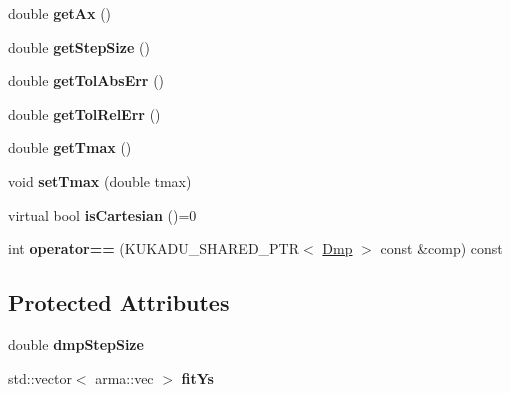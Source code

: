 \begin{DoxyCompactItemize}
\item 
\hypertarget{classkukadu_1_1Dmp_afecc2e30b16281ae8e46fbd0797ba9da}{double {\bfseries get\-Ax} ()}\label{classkukadu_1_1Dmp_afecc2e30b16281ae8e46fbd0797ba9da}

\item 
\hypertarget{classkukadu_1_1Dmp_aa88cf46b01a29848c307ab8c66cd3c1e}{double {\bfseries get\-Step\-Size} ()}\label{classkukadu_1_1Dmp_aa88cf46b01a29848c307ab8c66cd3c1e}

\item 
\hypertarget{classkukadu_1_1Dmp_ae72973627e7443f6b98b07891fba2705}{double {\bfseries get\-Tol\-Abs\-Err} ()}\label{classkukadu_1_1Dmp_ae72973627e7443f6b98b07891fba2705}

\item 
\hypertarget{classkukadu_1_1Dmp_a8a90b4bf9c8acf5a3aeaeb2c82671929}{double {\bfseries get\-Tol\-Rel\-Err} ()}\label{classkukadu_1_1Dmp_a8a90b4bf9c8acf5a3aeaeb2c82671929}

\item 
\hypertarget{classkukadu_1_1Dmp_aa7423b1cd8096790cc6162e7ecfb604b}{double {\bfseries get\-Tmax} ()}\label{classkukadu_1_1Dmp_aa7423b1cd8096790cc6162e7ecfb604b}

\item 
\hypertarget{classkukadu_1_1Dmp_a90ba745176c444fb74bfd24722ee8f60}{void {\bfseries set\-Tmax} (double tmax)}\label{classkukadu_1_1Dmp_a90ba745176c444fb74bfd24722ee8f60}

\item 
\hypertarget{classkukadu_1_1Dmp_ac64f37f77911ba0d6e67ea4041601dd8}{virtual bool {\bfseries is\-Cartesian} ()=0}\label{classkukadu_1_1Dmp_ac64f37f77911ba0d6e67ea4041601dd8}

\item 
\hypertarget{classkukadu_1_1Dmp_ad944a1f4b2e1857c390f3ab42d64d59b}{int {\bfseries operator==} (K\-U\-K\-A\-D\-U\-\_\-\-S\-H\-A\-R\-E\-D\-\_\-\-P\-T\-R$<$ \hyperlink{classkukadu_1_1Dmp}{Dmp} $>$ const \&comp) const }\label{classkukadu_1_1Dmp_ad944a1f4b2e1857c390f3ab42d64d59b}

\end{DoxyCompactItemize}
\subsection*{Protected Attributes}
\begin{DoxyCompactItemize}
\item 
\hypertarget{classkukadu_1_1Dmp_af0966b32d5f703b6c59a24332f994715}{double {\bfseries dmp\-Step\-Size}}\label{classkukadu_1_1Dmp_af0966b32d5f703b6c59a24332f994715}

\item 
\hypertarget{classkukadu_1_1Dmp_a1f5e7194bf55d600d9eb1e7447ed552d}{std\-::vector$<$ arma\-::vec $>$ {\bfseries fit\-Ys}}\label{classkukadu_1_1Dmp_a1f5e7194bf55d600d9eb1e7447ed552d}

\end{DoxyCompactItemize}



